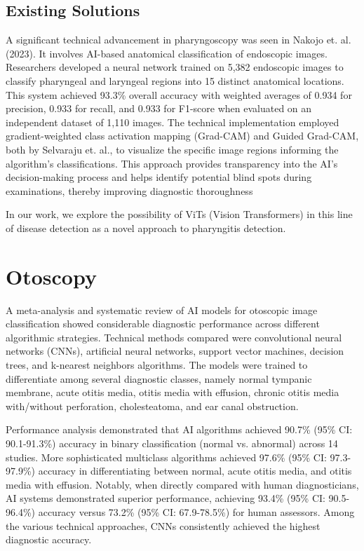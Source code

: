 \subsection{Existing Solutions}

A significant technical advancement in pharyngoscopy was seen in Nakojo et. al. (2023). It involves AI-based anatomical classification of endoscopic images. Researchers developed a neural network trained on 5,382 endoscopic images to classify pharyngeal and laryngeal regions into 15 distinct anatomical locations. This system achieved 93.3\% overall accuracy with weighted averages of 0.934 for precision, 0.933 for recall, and 0.933 for F1-score when evaluated on an independent dataset of 1,110 images. The technical implementation employed gradient-weighted class activation mapping (Grad-CAM) \cite{selva} and Guided Grad-CAM, both by Selvaraju et. al., to visualize the specific image regions informing the algorithm's classifications. This approach provides transparency into the AI's decision-making process and helps identify potential blind spots during examinations, thereby improving diagnostic thoroughness~\cite{nakajo} \par

In our work, we explore the possibility of ViTs (Vision Transformers) in this line of disease detection as a novel approach to pharyngitis detection.

\section{Otoscopy}

A meta-analysis and systematic review of AI models for otoscopic image classification showed considerable diagnostic performance across different algorithmic strategies. Technical methods compared were convolutional neural networks (CNNs), artificial neural networks, support vector machines, decision trees, and k-nearest neighbors algorithms. The models were trained to differentiate among several diagnostic classes, namely normal tympanic membrane, acute otitis media, otitis media with effusion, chronic otitis media with/without perforation, cholesteatoma, and ear canal obstruction.

Performance analysis demonstrated that AI algorithms achieved 90.7\% (95\% CI: 90.1-91.3\%) accuracy in binary classification (normal vs. abnormal) across 14 studies. More sophisticated multiclass algorithms achieved 97.6\% (95\% CI: 97.3-97.9\%) accuracy in differentiating between normal, acute otitis media, and otitis media with effusion. Notably, when directly compared with human diagnosticians, AI systems demonstrated superior performance, achieving 93.4\% (95\% CI: 90.5-96.4\%) accuracy versus 73.2\% (95\% CI: 67.9-78.5\%) for human assessors. Among the various technical approaches, CNNs consistently achieved the highest diagnostic accuracy. 
